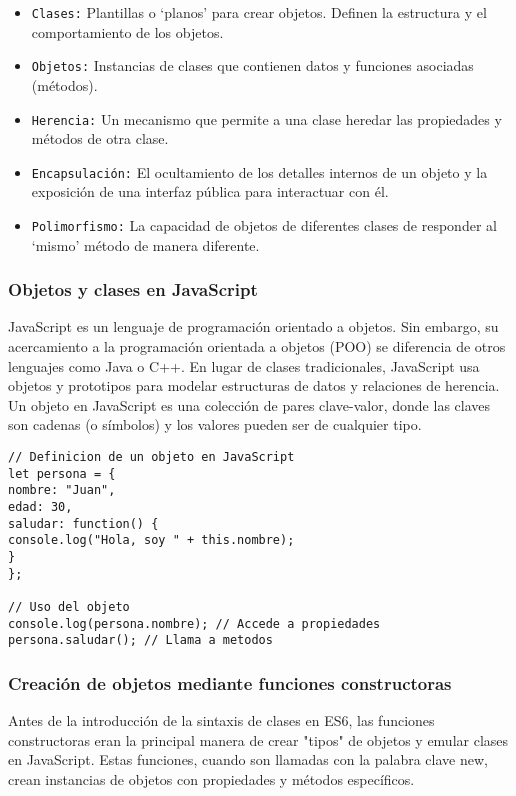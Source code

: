 \documentclass[executivepaper]{article}
\begin{document}
\begin{itemize}
  \item \texttt{Clases:} Plantillas o \enquote*{planos} para crear objetos. Definen la estructura y el comportamiento de los objetos.
  \item \texttt{Objetos:} Instancias de clases que contienen datos y funciones asociadas (métodos).
  \item \texttt{Herencia:} Un mecanismo que permite a una clase heredar las propiedades y métodos de otra clase.
  \item \texttt{Encapsulación:} El ocultamiento de los detalles internos de un objeto y la exposición de una interfaz pública para interactuar con él.
  \item \texttt{Polimorfismo:} La capacidad de objetos de diferentes clases de responder al \enquote*{mismo} método de manera diferente.
\end{itemize}

\subsubsection*{Objetos y clases en JavaScript}
JavaScript es un lenguaje de programación orientado a objetos. Sin embargo, su acercamiento a la programación orientada a objetos (POO) se diferencia de otros lenguajes como Java o C++. En lugar de clases tradicionales, JavaScript usa objetos y prototipos para modelar estructuras de datos y relaciones de herencia. Un objeto en JavaScript es una colección de pares clave-valor, donde las claves son cadenas (o símbolos) y los valores pueden ser de cualquier tipo.

\begin{lstlisting}
// Definicion de un objeto en JavaScript
let persona = {
nombre: "Juan",
edad: 30,
saludar: function() {
console.log("Hola, soy " + this.nombre);
}
};

// Uso del objeto
console.log(persona.nombre); // Accede a propiedades
persona.saludar(); // Llama a metodos
\end{lstlisting}

\subsubsection*{Creación de objetos mediante funciones constructoras}
Antes de la introducción de la sintaxis de clases en ES6, las funciones constructoras eran la principal manera de crear "tipos" de objetos y emular clases en JavaScript. Estas funciones, cuando son llamadas con la palabra clave new, crean instancias de objetos con propiedades y métodos específicos.
\end{document}
